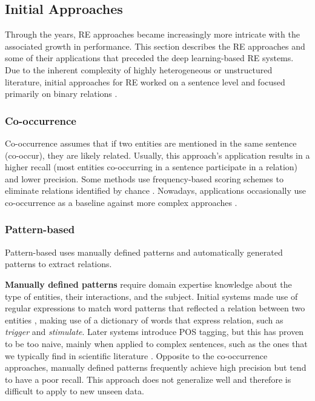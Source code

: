 \subsection{Initial Approaches}

Through the years, RE approaches became increasingly more intricate with the associated growth in performance. This section describes the RE approaches and some of their applications that preceded the deep learning-based RE systems. Due to the inherent complexity of highly heterogeneous or unstructured literature, initial approaches for RE worked on a sentence level \citep{lamurias2017extracting} and focused primarily on binary relations \citep{zhang2017review}.

\subsubsection{Co-occurrence}

Co-occurrence assumes that if two entities are mentioned in the same sentence (co-occur), they are likely related. Usually, this approach's application results in a higher recall (most entities co-occurring in a sentence participate in a relation) and lower precision. 
Some methods use frequency-based scoring schemes to eliminate relations identified by chance \citep{zweigenbaum2007frontiers}. Nowadays, applications occasionally use co-occurrence as a baseline against more complex approaches \citep{bunescu2006integrating}. 

\hypertarget{2.1.3.2}{\subsubsection{Pattern-based}}

Pattern-based uses manually defined patterns and automatically generated patterns to extract relations.

\textbf{Manually defined patterns} require domain expertise knowledge about the type of entities, their interactions, and the subject. 
Initial systems made use of regular expressions to match word patterns that reflected a relation between two entities \citep{smolinski2009computational}, making use of a dictionary of words that express relation, such as \textit{trigger} and \textit{stimulate}. Later systems introduce POS tagging, but this has proven to be too naive, mainly when applied to complex sentences, such as the ones that we typically find in scientific literature \citep{hao2005discovering}. Opposite to the co-occurrence approaches, manually defined patterns frequently achieve high precision but tend to have a poor recall. This approach does not generalize well and therefore is difficult to apply to new unseen data. 

